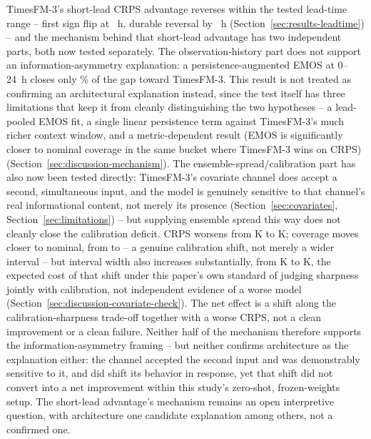 TimesFM-3's short-lead CRPS advantage reverses within the tested
lead-time range -- first sign flip at \FirstSignFlipHours{}~h, durable
reversal by \DurableCrossoverHours{}~h
(Section~\ref{sec:results-leadtime}) -- and the mechanism behind that
short-lead advantage has two independent parts, both now tested
separately. The observation-history part does not support an
information-asymmetry explanation: a persistence-augmented EMOS at
0--24~h closes only \PersistenceGapClosedPct{}\% of the gap toward
TimesFM-3. This result is not treated as confirming an architectural
explanation instead, since the test itself has three limitations that
keep it from cleanly distinguishing the two hypotheses -- a lead-pooled
EMOS fit, a single linear persistence term against TimesFM-3's much
richer context window, and a metric-dependent result (EMOS is
significantly closer to nominal coverage in the same bucket where
TimesFM-3 wins on CRPS) (Section~\ref{sec:discussion-mechanism}). The
ensemble-spread/calibration part has also now been tested directly:
TimesFM-3's covariate channel does accept a second, simultaneous input,
and the model is genuinely sensitive to that channel's real
informational content, not merely its presence
(Section~\ref{sec:covariates}, Section~\ref{sec:limitations}) -- but
supplying ensemble spread this way does not cleanly close the
calibration deficit. CRPS worsens from \CrpsTsfmFull{} K to
\CrpsTsfmTwoCov{} K; coverage moves closer to nominal, from
\CoverageTsfmFull{} to \CoverageTsfmTwoCov{} -- a genuine calibration
shift, not merely a wider interval -- but interval width also increases
substantially, from \WidthTsfmFull{} K to \WidthTsfmTwoCov{} K, the
expected cost of that shift under this paper's own standard of judging
sharpness jointly with calibration, not independent evidence of a worse
model (Section~\ref{sec:discussion-covariate-check}). The net effect is
a shift along the calibration-sharpness trade-off together with a worse
CRPS, not a clean improvement or a clean failure. Neither half of the
mechanism therefore supports the information-asymmetry framing -- but
neither confirms architecture as the explanation either: the channel
accepted the second input and was demonstrably sensitive to it, and did
shift its behavior in response, yet that shift did not convert into a
net improvement within this study's zero-shot, frozen-weights setup. The
short-lead advantage's mechanism remains an open interpretive question,
with architecture one candidate explanation among others, not a
confirmed one.

